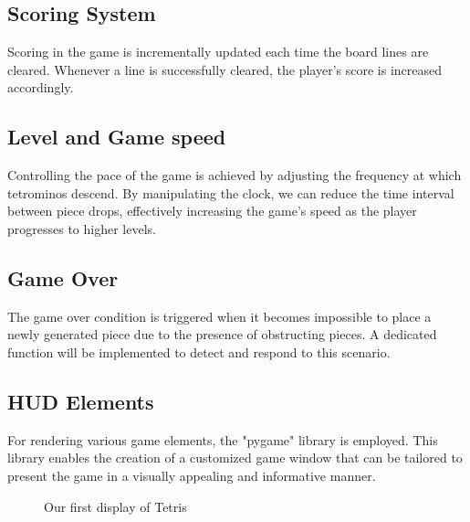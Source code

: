 \documentclass[conference]{IEEEtran}
\begin{document}
\subsection{Scoring System}
Scoring in the game is incrementally updated each time the board lines are cleared. Whenever a line is successfully cleared, the player's score is increased accordingly.
\subsection{Level and Game speed}
Controlling the pace of the game is achieved by adjusting the frequency at which tetrominos descend. By manipulating the clock, we can reduce the time interval between piece drops, effectively increasing the game's speed as the player progresses to higher levels.
\subsection{Game Over}
The game over condition is triggered when it becomes impossible to place a newly generated piece due to the presence of obstructing pieces. A dedicated function will be implemented to detect and respond to this scenario.
\subsection{HUD Elements}
For rendering various game elements, the "pygame"\cite{b4} library is employed. This library enables the creation of a customized game window that can be tailored to present the game in a visually appealing and informative manner.
\begin{figure}[h]
    \centering
    \caption{Our first display of Tetris}
    \label{fig:Display}
\end{figure}
\end{document}
